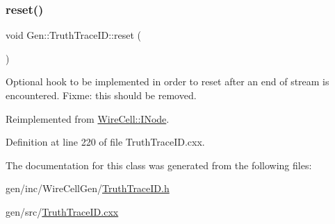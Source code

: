 \mbox{\label{class_wire_cell_1_1_gen_1_1_truth_trace_i_d_aedeb529661e4353e8666b9b59395b7b5}} 
\subsubsection{\texorpdfstring{reset()}{reset()}}
{\footnotesize\ttfamily void Gen\+::\+Truth\+Trace\+I\+D\+::reset (\begin{DoxyParamCaption}{ }\end{DoxyParamCaption})\hspace{0.3cm}{\ttfamily [virtual]}}

Optional hook to be implemented in order to reset after an end of stream is encountered. Fixme\+: this should be removed. 

Reimplemented from \hyperlink{class_wire_cell_1_1_i_node_a7bf4dfff146b72f866ab25f7662c56a0}{Wire\+Cell\+::\+I\+Node}.



Definition at line 220 of file Truth\+Trace\+I\+D.\+cxx.



The documentation for this class was generated from the following files\+:\begin{DoxyCompactItemize}
\item 
gen/inc/\+Wire\+Cell\+Gen/\hyperlink{_truth_trace_i_d_8h}{Truth\+Trace\+I\+D.\+h}\item 
gen/src/\hyperlink{_truth_trace_i_d_8cxx}{Truth\+Trace\+I\+D.\+cxx}\end{DoxyCompactItemize}
